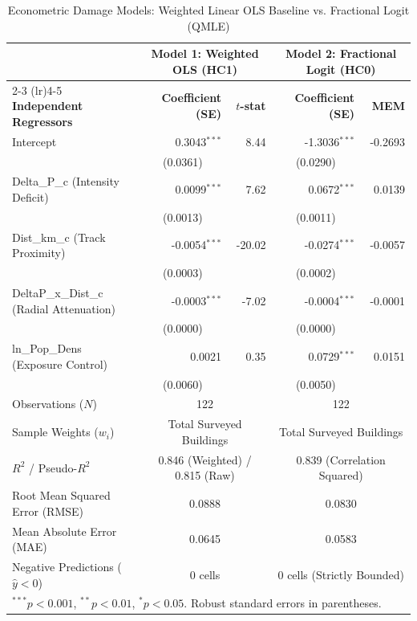 \begin{table}[h!]
\centering
\small
\caption{Econometric Damage Models: Weighted Linear OLS Baseline vs. Fractional Logit (QMLE)}
\label{tab:regression_comparison}
\begin{tabularx}{\textwidth}{X r r r r}
\toprule
 & \multicolumn{2}{c}{\textbf{Model 1: Weighted OLS (HC1)}} & \multicolumn{2}{c}{\textbf{Model 2: Fractional Logit (HC0)}} \\
\cmidrule(lr){2-3} \cmidrule(lr){4-5}
\textbf{Independent Regressors} & \textbf{Coefficient (SE)} & \textbf{$t$-stat} & \textbf{Coefficient (SE)} & \textbf{MEM} \\
\midrule
Intercept & 0.3043$^{***}$ & 8.44 & -1.3036$^{***}$ & -0.2693 \\
 & \multicolumn{1}{c}{(0.0361)} & & \multicolumn{1}{c}{(0.0290)} & \\
\addlinespace[2pt]
Delta\_P\_c (Intensity Deficit) & 0.0099$^{***}$ & 7.62 & 0.0672$^{***}$ & 0.0139 \\
 & \multicolumn{1}{c}{(0.0013)} & & \multicolumn{1}{c}{(0.0011)} & \\
\addlinespace[2pt]
Dist\_km\_c (Track Proximity) & -0.0054$^{***}$ & -20.02 & -0.0274$^{***}$ & -0.0057 \\
 & \multicolumn{1}{c}{(0.0003)} & & \multicolumn{1}{c}{(0.0002)} & \\
\addlinespace[2pt]
DeltaP\_x\_Dist\_c (Radial Attenuation) & -0.0003$^{***}$ & -7.02 & -0.0004$^{***}$ & -0.0001 \\
 & \multicolumn{1}{c}{(0.0000)} & & \multicolumn{1}{c}{(0.0000)} & \\
\addlinespace[2pt]
ln\_Pop\_Dens (Exposure Control) & 0.0021 & 0.35 & 0.0729$^{***}$ & 0.0151 \\
 & \multicolumn{1}{c}{(0.0060)} & & \multicolumn{1}{c}{(0.0050)} & \\
\addlinespace[2pt]
\midrule
Observations ($N$) & \multicolumn{2}{c}{122} & \multicolumn{2}{c}{122} \\
Sample Weights ($w_i$) & \multicolumn{2}{c}{Total Surveyed Buildings} & \multicolumn{2}{c}{Total Surveyed Buildings} \\
$R^2$ / Pseudo-$R^2$ & \multicolumn{2}{c}{0.846 (Weighted) / 0.815 (Raw)} & \multicolumn{2}{c}{0.839 (Correlation Squared)} \\
Root Mean Squared Error (RMSE) & \multicolumn{2}{c}{0.0888} & \multicolumn{2}{c}{0.0830} \\
Mean Absolute Error (MAE) & \multicolumn{2}{c}{0.0645} & \multicolumn{2}{c}{0.0583} \\
Negative Predictions ($\hat{y} < 0$) & \multicolumn{2}{c}{0 cells} & \multicolumn{2}{c}{0 cells (Strictly Bounded)} \\
\bottomrule
\multicolumn{5}{l}{\footnotesize $^{***}p < 0.001$, $^{**}p < 0.01$, $^{*}p < 0.05$. Robust standard errors in parentheses.} \\
\end{tabularx}
\end{table}
